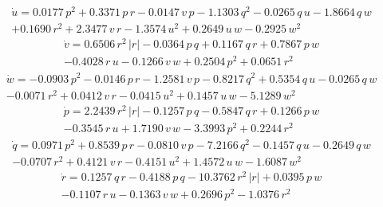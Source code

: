 \documentclass[12pt,a4]{article}
\begin{document}
\begin{multline}
	\dot{u} = 0.0177\,p^2+0.3371\,p\,r-0.0147\,v\,p-1.1303\,q^2-0.0265\,q\,u-1.8664\,q\,w\\
	+0.1690\,r^2+2.3477\,v\,r-1.3574\,u^2+0.2649\,u\,w-0.2925\,w^2
\end{multline}
\begin{multline}
	\dot{v} = 0.6506\,r^2\,\left|r\right|-0.0364\,p\,q+0.1167\,q\,r+0.7867\,p\,w\\
	-0.4028\,r\,u-0.1266\,v\,w+0.2504\,p^2+0.0651\,r^2
\end{multline}
\begin{multline}
	\dot{w} = -0.0903\,p^2-0.0146\,p\,r-1.2581\,v\,p-0.8217\,q^2+0.5354\,q\,u-0.0265\,q\,w\\
	-0.0071\,r^2+0.0412\,v\,r-0.0415\,u^2+0.1457\,u\,w-5.1289\,w^2
\end{multline}
\begin{multline}
	\dot{p} = 2.2439\,r^2\,\left|r\right|-0.1257\,p\,q-0.5847\,q\,r+0.1266\,p\,w\\
	-0.3545\,r\,u+1.7190\,v\,w-3.3993\,p^2+0.2244\,r^2
\end{multline}
\begin{multline}
	\dot{q} = 0.0971\,p^2+0.8539\,p\,r-0.0810\,v\,p-7.2166\,q^2-0.1457\,q\,u-0.2649\,q\,w\\
	-0.0707\,r^2+0.4121\,v\,r-0.4151\,u^2+1.4572\,u\,w-1.6087\,w^2
\end{multline}
\begin{multline}
	\dot{r} = 0.1257\,q\,r-0.4188\,p\,q-10.3762\,r^2\,\left|r\right|+0.0395\,p\,w\\
	-0.1107\,r\,u-0.1363\,v\,w+0.2696\,p^2-1.0376\,r^2
\end{multline}
\end{document}
